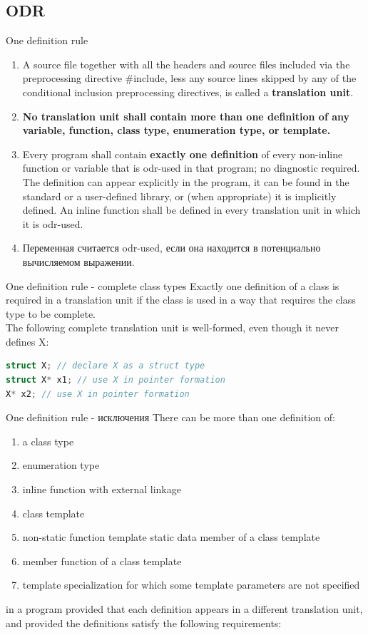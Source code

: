 \documentclass[10pt]{beamer}
\begin{document}
\subsection{ODR}
\begin{frame}[fragile]{One definition rule}
\begin{enumerate}
\item A source file together with all the headers and source files included via the preprocessing directive
#include, less any source lines skipped by any of the conditional inclusion preprocessing directives, is called a \textbf{translation unit}.
\item \textbf{No translation unit shall contain more than one definition of any variable, function, class type, enumeration type, or template.}
\item Every program shall contain \textbf{exactly one definition} of every non-inline function or variable that is odr-used in that program; no diagnostic required. The definition can appear explicitly in the program, it can be found
in the standard or a user-defined library, or (when appropriate) it is implicitly defined. An inline function shall be defined in every translation unit in which it is odr-used.
\item Переменная считается odr-used, если она находится в потенциально вычисляемом выражении.
\end{enumerate}
\end{frame}

\begin{frame}[fragile]{One definition rule - complete class types}
Exactly one definition of a class is required in a translation unit if the class is used in a way that requires the
class type to be complete.\\
The following complete translation unit is well-formed, even though it never defines X:
\begin{lstlisting}[language=C++]
struct X; // declare X as a struct type
struct X* x1; // use X in pointer formation
X* x2; // use X in pointer formation
\end{lstlisting}
\end{frame}

\begin{frame}[fragile]{One definition rule - исключения}
There can be more than one definition of:
\begin{enumerate}
\item a class type
\item enumeration type
\item inline function with external linkage
\item class template 
\item non-static function template
\tiem static data member of a class template
\item member function of a class template
\item template specialization for which some template parameters are not specified
\end{enumerate}
in a program provided that each definition appears in a different translation unit, and provided the definitions satisfy the following requirements:
\end{frame}
\end{document}
